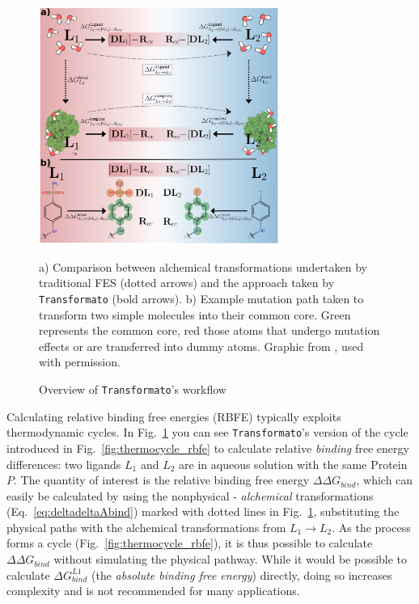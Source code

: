 \documentclass[oneside]{scrreprt}
\begin{document}
\begin{figure}[h]
    \begin{center}
        
    
    \includegraphics[width=0.7\textwidth]{figs/alchemical_path_v5.png}
    \end{center}
    \caption{Overview of \texttt{Transformato}'s workflow}
    a) Comparison between alchemical transformations undertaken by traditional FES (dotted arrows) and the approach taken by \texttt{Transformato} (bold arrows). b) Example mutation path taken to transform two simple molecules into their common core. Green represents the common core, red those atoms that undergo mutation effects or are transferred into dummy atoms. Graphic from \cite{karwounopoulos_relative_2022}, used with permission.
    \label{fig:fesvstrafo}
\end{figure}


Calculating relative binding free energies (RBFE) typically exploits thermodynamic cycles. In Fig.~\ref{fig:fesvstrafo} you can see \texttt{Transformato}'s version of the cycle introduced in Fig.~\ref{fig:thermocycle_rbfe} to calculate relative \emph{binding} free energy differences: two ligands $L_1$ and $L_2$ are in aqueous solution with the same Protein $P$. The quantity of interest is the relative binding free energy $\Delta \Delta G_{bind}$, which can easily be calculated by using the nonphysical - \emph{alchemical} transformations (Eq.~\ref{eq:deltadeltaAbind}) marked with dotted lines in Fig.~\ref{fig:fesvstrafo}, substituting the physical paths with the alchemical transformations from $L_1\rightarrow L_2$. As the process forms a cycle (Fig.~\ref{fig:thermocycle_rbfe}), it is thus possible to calculate $\Delta \Delta G_{bind}$ without  simulating the physical pathway. While it would be possible to calculate $\Delta G^{L1}_{bind}$ (the  \emph{absolute binding free energy}) directly, doing so increases complexity and is not recommended for many applications\cite{mey_best_2020}.
\end{document}
